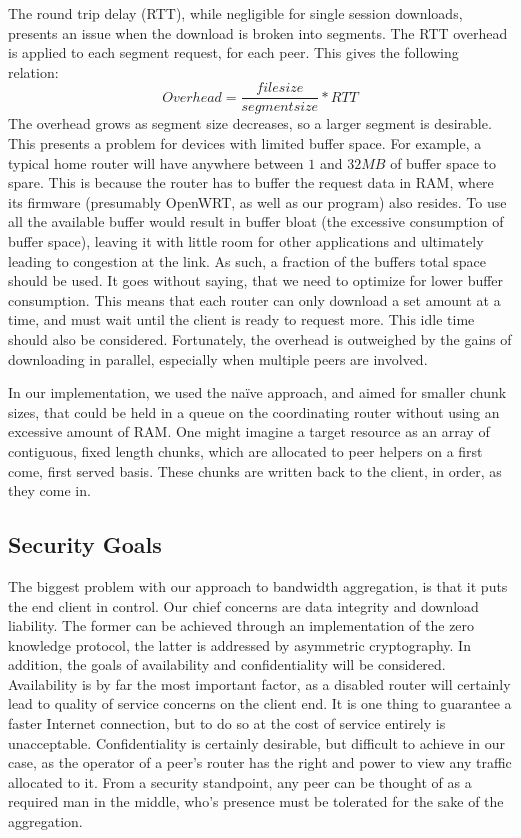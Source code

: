 \documentclass[12pt]{article}
\begin{document}
			The round trip delay (RTT), while negligible for single session downloads, presents an issue when the download is broken into segments. The RTT overhead is applied to each segment request, for each peer. This gives the following relation:
			$$Overhead = \frac{file size}{segment size} * RTT$$
			The overhead grows as segment size decreases, so a larger segment is desirable. This presents a problem for devices with limited buffer space. For example, a typical home router will have anywhere between $1$ and $32MB$ of buffer space to spare. This is because the router has to buffer the request data in RAM, where its firmware (presumably OpenWRT, as well as our program) also resides. To use all the available buffer would result in buffer bloat (the excessive consumption of buffer space), leaving it with little room for other applications and ultimately leading to congestion at the link. As such, a fraction of the buffers total space should be used. It goes without saying, that we need to optimize for lower buffer consumption. This means that each router can only download a set amount at a time, and must wait until the client is ready to request more. This idle time should also be considered. Fortunately, the overhead is outweighed by the gains of downloading in parallel, especially when multiple peers are involved.

			In our implementation, we used the na\"{i}ve approach, and aimed for smaller chunk sizes, that could be held in a queue on the coordinating router without using an excessive amount of RAM. One might imagine a target resource as an array of contiguous, fixed length chunks, which are allocated to peer helpers on a first come, first served basis. These chunks are written back to the client, in order, as they come in.

	\subsection{Security Goals}

		The biggest problem with our approach to bandwidth aggregation, is that it puts the end client in control. Our chief concerns are data integrity and download liability. The former can be achieved through an implementation of the zero knowledge protocol, the latter is addressed by asymmetric cryptography. In addition, the goals of availability and confidentiality will be considered. Availability is by far the most important factor, as a disabled router will certainly lead to quality of service concerns on the client end. It is one thing to guarantee a faster Internet connection, but to do so at the cost of service entirely is unacceptable. Confidentiality is certainly desirable, but difficult to achieve in our case, as the operator of a peer's router has the right and power to view any traffic allocated to it. From a security standpoint, any peer can be thought of as a required man in the middle, who's presence must be tolerated for the sake of the aggregation. 
\end{document}
